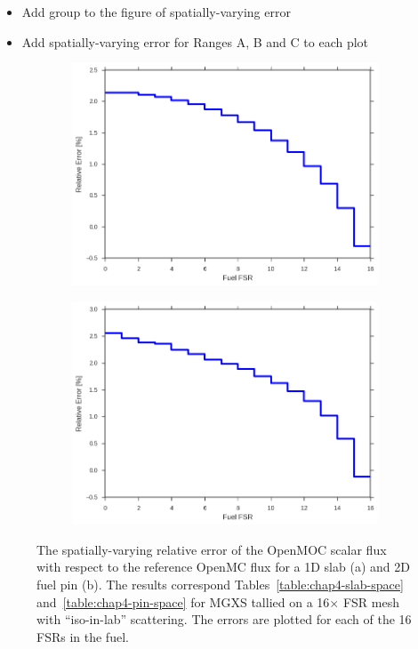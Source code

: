 \begin{itemize}[noitemsep]
  \item Add group to the figure of spatially-varying error
  \item Add spatially-varying error for Ranges A, B and C to each plot
\end{itemize}

\begin{figure}[H]
\begin{subfigure}{.9\textwidth}
  \centering
  \includegraphics[width=\linewidth]{figures/biases/slab/rel-err-fuel-fsrs}
  \caption{}
\end{subfigure}
\begin{subfigure}{.9\textwidth}
  \centering
  \includegraphics[width=\linewidth]{figures/biases/pin-cell/rel-err-fuel-fsrs}
  \caption{}
\end{subfigure}
\caption[Flux relative error by FSR]{The spatially-varying relative error of the OpenMOC scalar flux with respect to the reference OpenMC flux for a 1D slab (a) and 2D fuel pin (b). The results correspond Tables~\ref{table:chap4-slab-space} and~\ref{table:chap4-pin-space} for \ac{MGXS} tallied on a 16$\times$ \ac{FSR} mesh with ``iso-in-lab'' scattering. The errors are plotted for each of the 16 \ac{FSR}s in the fuel.}
\label{fig:chap4-rel-err-space}
\end{figure}

